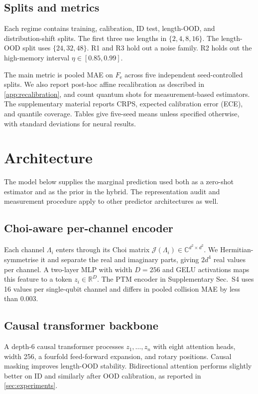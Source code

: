 \documentclass[12pt]{iopart}
\newcommand{\Fe}{F_{\mathrm{e}}}
\newcommand{\Choi}{\mathcal{J}}
\newcommand{\Lset}{\Lambda}
\begin{document}
\subsection{Splits and metrics}

Each regime contains training, calibration, ID test, length-OOD, and distribution-shift splits. The first three use lengths in $\{2,4,8,16\}$. The length-OOD split uses $\{24,32,48\}$. R1 and R3 hold out a noise family. R2 holds out the high-memory interval $\eta\in[0.85,0.99]$.

The main metric is pooled MAE on $\Fe$ across five independent seed-controlled splits. We also report post-hoc affine recalibration as described in \ref{app:recalibration}, and count quantum shots for measurement-based estimators. The supplementary material reports CRPS, expected calibration error (ECE), and quantile coverage. Tables give five-seed means unless specified otherwise, with standard deviations for neural results.


\section{Architecture}
\label{sec:arch}

The model below supplies the marginal prediction used both as a zero-shot estimator and as the prior in the hybrid. The representation audit and measurement procedure apply to other predictor architectures as well.

\subsection{Choi-aware per-channel encoder}

Each channel $\Lset_i$ enters through its Choi matrix $\Choi(\Lset_i) \in \mathbb{C}^{d^2 \times d^2}$. We Hermitian-symmetrise it and separate the real and imaginary parts, giving $2d^4$ real values per channel. A two-layer MLP with width $D=256$ and GELU activations maps this feature to a token $z_i \in \mathbb{R}^{D}$. The PTM encoder in Supplementary Sec.~S4 uses 16 values per single-qubit channel and differs in pooled collision MAE by less than $0.003$.

\subsection{Causal transformer backbone}

A depth-$6$ causal transformer processes $z_1, \ldots, z_n$ with eight attention heads, width 256, a fourfold feed-forward expansion, and rotary positions. Causal masking improves length-OOD stability. Bidirectional attention performs slightly better on ID and similarly after OOD calibration, as reported in \cref{sec:experiments}.
\end{document}
